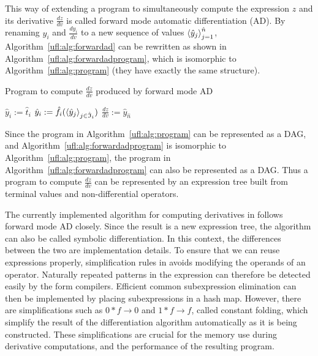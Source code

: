 This way of extending a program to simultaneously compute the expression
$z$ and its derivative $\frac{d z}{d v}$ is called forward mode automatic
differentiation (AD).  By renaming $y_i$ and $\frac{d
  y_i}{d v}$ to a new sequence of values $\left\langle{\hat y_j}\right\rangle_{j=1}^{\hat n}$,
  Algorithm~\ref{ufl:alg:forwardad} can be rewritten as shown in
Algorithm~\ref{ufl:alg:forwardadprogram}, which is isomorphic to
Algorithm~\ref{ufl:alg:program} (they have exactly the same structure).

\begin{algorithm}[!t]
\caption{Program to compute $\frac{d z}{d v}$ produced by forward mode AD}
\label{ufl:alg:forwardadprogram}
\begin{algorithmic}[1]
\State $\hat y_i := \hat t_i$
\EndFor
{}
\State $\hat y_i := \hat f_i(\left\langle{\hat y_j}\right\rangle_{j\in\hat{\mathfrak{I}}_i})$
\EndFor
\State $\frac{d z}{d v} := \hat y_{\hat n}$
\end{algorithmic}
\end{algorithm}

Since the program in Algorithm~\ref{ufl:alg:program} can be
represented as a DAG, and Algorithm~\ref{ufl:alg:forwardadprogram}
is isomorphic to Algorithm~\ref{ufl:alg:program}, the program in
Algorithm~\ref{ufl:alg:forwardadprogram} can also be represented as a DAG.
Thus a program to compute $\frac{d z}{d v}$ can be represented by an
expression tree built from terminal values and non-differential operators.

The currently implemented algorithm for computing derivatives in \ufl{}
follows forward mode AD closely. Since the result is a new expression
tree, the algorithm can also be called symbolic differentiation. In this
context, the differences between the two are implementation details.
To ensure that we can reuse expressions properly, simplification rules in
\ufl{} avoids modifying the operands of an operator.  Naturally repeated
patterns in the expression can therefore be detected easily by the
form compilers.  Efficient common subexpression elimination can then
be implemented by placing subexpressions in a hash map.  However, there
are simplifications such as $0*f\rightarrow 0$ and $1*f\rightarrow f$,
called constant folding, which simplify the result of the differentiation
algorithm automatically as it is being constructed.  These simplifications
are crucial for the memory use during derivative computations, and the
performance of the resulting program.
